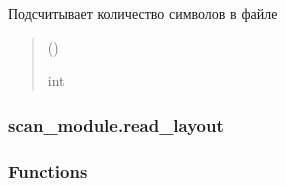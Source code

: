 \documentclass[a4paper,11pt,russian,openany,oneside]{sphinxmanual}
\begin{document}
\begin{savenotes}\begin{fulllineitems}
\label{\detokenize{_autosummary/scan_module.read_files:scan_module.read_files.count_characters_in_file}}
\pysigstartsignatures
\pysiglinewithargsret
{}
{}
{}
\pysigstopsignatures
\sphinxAtStartPar
Подсчитывает количество символов в файле
\begin{quote}\begin{description}
\sphinxAtStartPar
{} ()

\sphinxAtStartPar
int

\end{description}\end{quote}

\end{fulllineitems}\end{savenotes}


\sphinxstepscope


\subsubsection{scan\_module.read\_layout}
\label{\detokenize{_autosummary/scan_module.read_layout:module-scan_module.read_layout}}\label{\detokenize{_autosummary/scan_module.read_layout:scan-module-read-layout}}\label{\detokenize{_autosummary/scan_module.read_layout::doc}}\subsubsection*{Functions}
\end{document}
